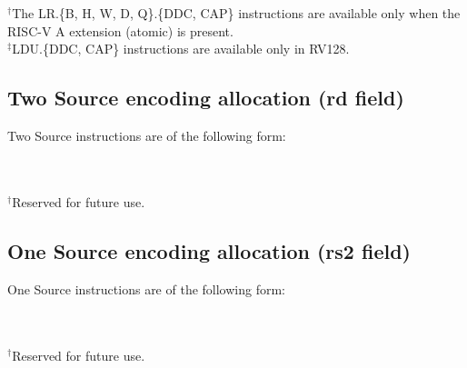 {	\rvcheriheader

	\vspace{1em}

	{\rvcherienctablefontsize
	\def\rvcheriatomicfootnotemark{$^\dagger$}
	\def\rvcherildufootnotemark{$^\ddagger$}
	\rvcherienctableexpload\\\\
	\footnotesize
	$^\dagger$The LR.\{B, H, W, D, Q\}.\{DDC, CAP\} instructions are available only when the RISC-V A extension (atomic) is present.\\
	$^\ddagger$LDU.\{DDC, CAP\} instructions are available only in RV128.
	}

	\vspace{1em}

	\subsection*{Two Source encoding allocation  (rd field)}
	Two Source instructions are of the following form:
	\vspace{1em}

	\rvcheriheader

	\vspace{1em}

	{\rvcherienctablefontsize
	\def\rvcherireservedfootnotemark{$^\dagger$}
	\rvcherienctablesrcsrc\\\\
	\footnotesize
	$^\dagger$Reserved for future use.
	}

	\vspace{1em}

	\subsection*{One Source encoding allocation (rs2 field)}
	One Source instructions are of the following form:

	\vspace{1em}

	\rvcheriheader

	\vspace{1em}

	{\rvcherienctablefontsize
	\def\rvcherireservedfootnotemark{$^\dagger$}
	\rvcherienctablesrc\\\\
	\footnotesize
	$^\dagger$Reserved for future use.
	}

}
